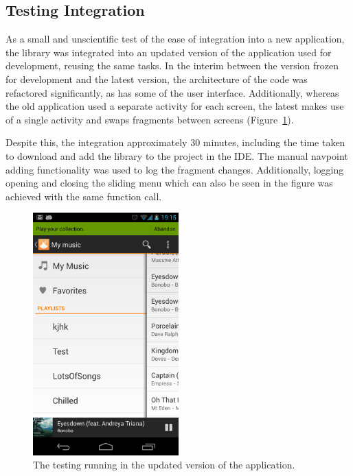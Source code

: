 \subsection{Testing Integration}

As a small and unscientific test of the ease of integration into a
new application, the library was integrated into an updated version
of the application used for development, reusing the same 
tasks. In the interim between the version
frozen for development and the latest version, the architecture of
the code was refactored significantly, as has some of the user
interface. Additionally, whereas the old application used a separate
activity for each screen, the latest makes use of a single activity
and swaps fragments between screens (Figure~\ref{fig:updated-application}). 

Despite this, the integration approximately 30 minutes, including the time taken
to download and add the library to the project in the IDE\@. The manual
navpoint adding functionality was used to log the fragment changes. Additionally,
logging opening and closing the sliding menu which can also be seen in
the figure was achieved with the same function call.

\begin{figure}[h]
  \centering 
  \includegraphics[width=0.5\textwidth]{images/updated-application}
  \caption{The testing running in the updated version of the application.}
  \label{fig:updated-application}
\end{figure}

